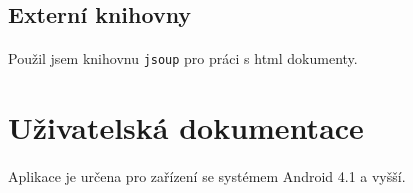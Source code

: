 \documentclass[12pt,a4paper,titlepage]{article}
\begin{document}
	\subsection{Externí knihovny}{
	\paragraph{}
	Použil jsem knihovnu \texttt{jsoup} pro práci s html dokumenty. 
	
\pagebreak
\section{Uživatelská dokumentace}
	\paragraph{}
	Aplikace je určena pro zařízení se systémem Android 4.1 a vyšší.
	
}
\end{document}
